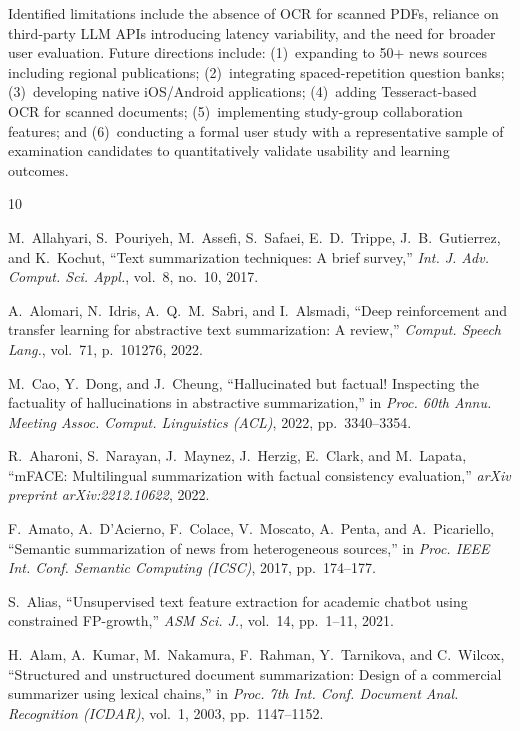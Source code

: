 \documentclass[conference]{IEEEtran}
\begin{document}
Identified limitations include the absence of OCR for scanned PDFs, reliance on third-party LLM APIs introducing latency variability, and the need for broader user evaluation. Future directions include: (1)~expanding to 50+ news sources including regional publications; (2)~integrating spaced-repetition question banks; (3)~developing native iOS/Android applications; (4)~adding Tesseract-based OCR for scanned documents; (5)~implementing study-group collaboration features; and (6)~conducting a formal user study with a representative sample of examination candidates to quantitatively validate usability and learning outcomes.

\begin{thebibliography}{10}

M.~Allahyari, S.~Pouriyeh, M.~Assefi, S.~Safaei, E.~D.~Trippe, J.~B.~Gutierrez, and K.~Kochut, ``Text summarization techniques: A brief survey,'' \textit{Int. J. Adv. Comput. Sci. Appl.}, vol.~8, no.~10, 2017.

A.~Alomari, N.~Idris, A.~Q.~M.~Sabri, and I.~Alsmadi, ``Deep reinforcement and transfer learning for abstractive text summarization: A review,'' \textit{Comput. Speech Lang.}, vol.~71, p.~101276, 2022.

M.~Cao, Y.~Dong, and J.~Cheung, ``Hallucinated but factual! Inspecting the factuality of hallucinations in abstractive summarization,'' in \textit{Proc. 60th Annu. Meeting Assoc. Comput. Linguistics (ACL)}, 2022, pp.~3340--3354.

R.~Aharoni, S.~Narayan, J.~Maynez, J.~Herzig, E.~Clark, and M.~Lapata, ``mFACE: Multilingual summarization with factual consistency evaluation,'' \textit{arXiv preprint arXiv:2212.10622}, 2022.

F.~Amato, A.~D'Acierno, F.~Colace, V.~Moscato, A.~Penta, and A.~Picariello, ``Semantic summarization of news from heterogeneous sources,'' in \textit{Proc. IEEE Int. Conf. Semantic Computing (ICSC)}, 2017, pp.~174--177.

S.~Alias, ``Unsupervised text feature extraction for academic chatbot using constrained FP-growth,'' \textit{ASM Sci. J.}, vol.~14, pp.~1--11, 2021.

H.~Alam, A.~Kumar, M.~Nakamura, F.~Rahman, Y.~Tarnikova, and C.~Wilcox, ``Structured and unstructured document summarization: Design of a commercial summarizer using lexical chains,'' in \textit{Proc. 7th Int. Conf. Document Anal. Recognition (ICDAR)}, vol.~1, 2003, pp.~1147--1152.


\end{thebibliography}
\end{document}

